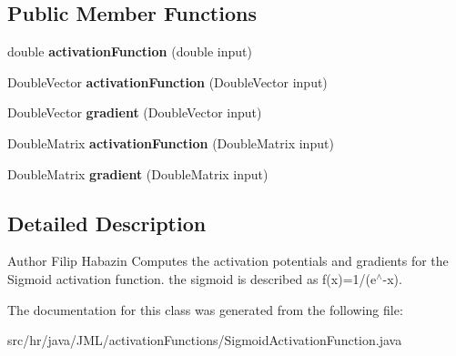 \subsection*{Public Member Functions}
\begin{DoxyCompactItemize}
\item 
\hypertarget{classhr_1_1java_1_1_j_m_l_1_1activation_functions_1_1_sigmoid_activation_function_a702f077516bb8f658da835e96f317446}{double {\bfseries activation\+Function} (double input)}\label{classhr_1_1java_1_1_j_m_l_1_1activation_functions_1_1_sigmoid_activation_function_a702f077516bb8f658da835e96f317446}

\item 
\hypertarget{classhr_1_1java_1_1_j_m_l_1_1activation_functions_1_1_sigmoid_activation_function_aaa6e666ecd62804576e5295ddbabca0c}{Double\+Vector {\bfseries activation\+Function} (Double\+Vector input)}\label{classhr_1_1java_1_1_j_m_l_1_1activation_functions_1_1_sigmoid_activation_function_aaa6e666ecd62804576e5295ddbabca0c}

\item 
\hypertarget{classhr_1_1java_1_1_j_m_l_1_1activation_functions_1_1_sigmoid_activation_function_a53a843666b3ee22fe797fbdd36ed0b12}{Double\+Vector {\bfseries gradient} (Double\+Vector input)}\label{classhr_1_1java_1_1_j_m_l_1_1activation_functions_1_1_sigmoid_activation_function_a53a843666b3ee22fe797fbdd36ed0b12}

\item 
\hypertarget{classhr_1_1java_1_1_j_m_l_1_1activation_functions_1_1_sigmoid_activation_function_ad171e4ccf0c2d891a470dd7bbbb7b084}{Double\+Matrix {\bfseries activation\+Function} (Double\+Matrix input)}\label{classhr_1_1java_1_1_j_m_l_1_1activation_functions_1_1_sigmoid_activation_function_ad171e4ccf0c2d891a470dd7bbbb7b084}

\item 
\hypertarget{classhr_1_1java_1_1_j_m_l_1_1activation_functions_1_1_sigmoid_activation_function_a4a3fc77fb29697da7e7dd9445360da4d}{Double\+Matrix {\bfseries gradient} (Double\+Matrix input)}\label{classhr_1_1java_1_1_j_m_l_1_1activation_functions_1_1_sigmoid_activation_function_a4a3fc77fb29697da7e7dd9445360da4d}

\end{DoxyCompactItemize}


\subsection{Detailed Description}
\begin{DoxyAuthor}{Author}
Filip Habazin Computes the activation potentials and gradients for the Sigmoid activation function. the sigmoid is described as f(x)=1/(e$^\wedge$-\/x). 
\end{DoxyAuthor}


The documentation for this class was generated from the following file\+:\begin{DoxyCompactItemize}
\item 
src/hr/java/\+J\+M\+L/activation\+Functions/Sigmoid\+Activation\+Function.\+java\end{DoxyCompactItemize}
